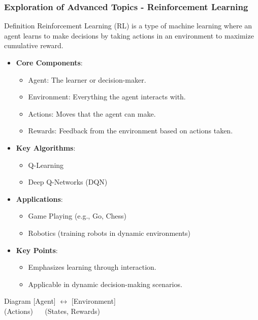 \documentclass[aspectratio=169]{beamer}
\begin{document}
\begin{frame}[fragile]
    \frametitle{Exploration of Advanced Topics - Reinforcement Learning}
    \begin{block}{Definition}
        Reinforcement Learning (RL) is a type of machine learning where an agent learns to make decisions by taking actions in an environment to maximize cumulative reward.
    \end{block}
    
    \begin{itemize}
        \item \textbf{Core Components}:
        \begin{itemize}
            \item Agent: The learner or decision-maker.
            \item Environment: Everything the agent interacts with.
            \item Actions: Moves that the agent can make.
            \item Rewards: Feedback from the environment based on actions taken.
        \end{itemize}
        
        \item \textbf{Key Algorithms}:
        \begin{itemize}
            \item Q-Learning
            \item Deep Q-Networks (DQN)
        \end{itemize}
    
        \item \textbf{Applications}:
        \begin{itemize}
            \item Game Playing (e.g., Go, Chess)
            \item Robotics (training robots in dynamic environments)
        \end{itemize}
        
        \item \textbf{Key Points}:
        \begin{itemize}
            \item Emphasizes learning through interaction.
            \item Applicable in dynamic decision-making scenarios.
        \end{itemize}
    \end{itemize}

    \begin{block}{Diagram}
        [Agent] $\longleftrightarrow$ [Environment] \\
        (Actions) $\quad$ (States, Rewards)
    \end{block}
\end{frame}
\end{document}
